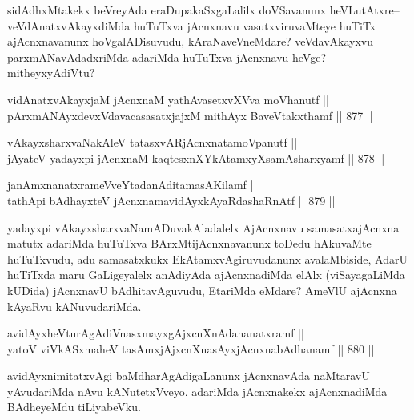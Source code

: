\begin{artha}
sidAdhxMtakekx beVreyAda eraDupakaSxgaLalilx doVSavanunx heVLutAtxre{\rm --} veVdAnatxvAkayxdiMda huTuTxva jAcnxnavu vasutxviruvaMteye huTiTx ajAcnxnavanunx hoVgalADisuvudu, kAraNaveVneMdare? veVdavAkayxvu parxmANavAdadxriMda adariMda huTuTxva jAcnxnavu heVge? mitheyxyAdiVtu?
\end{artha}

\begin{shl}
vidAnatxvAkayxjaM jAcnxnaM yathAvasetxvXVva moVhanutf || \\
pArxmANAyxdevxVdavacasasatxjajxM mithAyx BaveVtakxthamf \hfill || 877 ||  
\end{shl}



\begin{shl}
vAkayxsharxvaNakAleV tatasxvARjAcnxnatamoVpanutf || \\
jAyateV yadayxpi jAcnxnaM kaqtesxnXYkAtamxyXsamAsharxyamf \hfill || 878 ||  
\end{shl}
				
\begin{shl}
janAmxnanatxrameVveYtadanAditamasA\s Kilamf || \\
tathA\s pi bAdhayxteV jAcnxnamavidAyxkAyaRdashaRnAtf \hfill || 879 ||  
\end{shl}

\begin{artha}
yadayxpi vAkayxsharxvaNamADuvakAladalelx AjAcnxnavu samasatxajAcnxna matutx adariMda huTuTxva BArxMtijAcnxnavanunx toDedu hAkuvaMte huTuTxvudu, adu samasatxkukx EkAtamxvAgiruvudanunx avalaMbiside, AdarU huTiTxda maru GaLigeyalelx anAdiyAda ajAcnxnadiMda elAlx (viSayagaLiMda kUDida) jAcnxnavU bAdhitavAguvudu, EtariMda eMdare? AmeVlU ajAcnxna kAyaRvu kANuvudariMda.
\end{artha}

\begin{shl}
avidAyxheVturAgAdiVnasxmayxgAjxcnXnAdananatxramf || \\
yatoV viVkASxmaheV tasAmxjAjxcnXnasAyxjAcnxnabAdhanamf \hfill || 880 ||  
\end{shl}

\begin{artha}
avidAyxnimitatxvAgi baMdharAgAdigaLanunx jAcnxnavAda naMtaravU yAvudariMda nAvu kANutetxVveyo. adariMda jAcnxnakekx ajAcnxnadiMda BAdheyeMdu tiLiyabeVku.
\end{artha}

